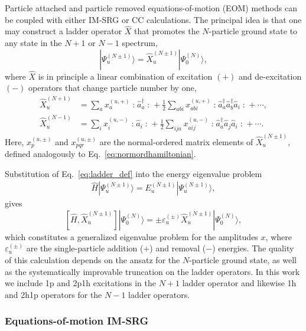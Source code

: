\documentclass[aip, jcp, 12pt]{revtex4-1}
\newcommand{\ket}[1]{| #1 \rangle}
\newcommand{\normord}[1]{\mathopen: #1 \mathclose:}
\begin{document}
Particle attached and particle removed equations-of-motion (EOM) methods can be coupled with either IM-SRG or CC calculations. The principal idea is that one may construct a ladder operator $\hat{X}$ that promotes the $N$-particle ground state to any state in the $N + 1$ or $N - 1$ spectrum,
\begin{equation}\label{eq:ladder_def}
  \ket{\Psi^{(N \pm 1)}_u}  = \hat{X}^{(N \pm 1)}_u \ket{\Psi^{(N)}_0},
\end{equation}
where $\hat{X}$ is in principle a linear combination of excitation $(+)$ and de-excitation $(-)$ operators that change particle number by one,
\begin{align}
  \label{eq:gen_attached}
  \hat{X}^{(N + 1)}_u &= \sum_a x^{(u, +)}_a  \normord{\hat{a}^\dagger_a} + \frac{1}{2} \sum_{a b i} x^{(u, +)}_{a b i} \normord{\hat{a}^\dagger_a \hat{a}^\dagger_b \hat{a}_i^{}} + \cdots,  \\
  \label{eq:gen_removed}
  \hat{X}^{(N - 1)}_u &= \sum_i x_i^{(u, -)} \normord{\hat{a}_i^{}} + \frac{1}{2} \sum_{i j a} x^{(u, -)}_{a i j} \normord{\hat{a}^\dagger_a \hat{a}_j^{} \hat{a}_i^{}}  + \cdots.
\end{align}
Here, $x^{(u, \pm)}_p$ and $x^{(u, \pm)}_{p q r}$ are the normal-ordered matrix elements of $\hat{X}_u^{(N \pm 1)}$, defined analogously to Eq.\ \eqref{eq:normordhamiltonian}.

Substitution of Eq.\ \eqref{eq:ladder_def} into the energy eigenvalue problem
\begin{gather*}
  \hat H \ket{\Psi_u^{(N \pm 1)}} = E^{(N\pm1)}_u \ket{\Psi_u^{(N \pm 1)}},
\end{gather*}
gives
\begin{equation}\label{eq:EOM}
  [\hat{H}, \hat{X}^{(N \pm 1)}_u] \ket{\Psi^{(N)}_0} = \pm \varepsilon^{(\pm)}_u \hat{X}^{(N \pm 1)}_u \ket{\Psi^{(N)}_0},
\end{equation}
which constitutes a generalized eigenvalue problem for the amplitudes $x$, where $\varepsilon^{(\pm)}_u$ are the single-particle addition ($+$) and removal ($-$) energies. The quality of this calculation depends on the ansatz for the $N$-particle ground state, as well as the systematically improvable truncation on the ladder operators. In this work we include 1p and 2p1h excitations in the $N + 1$ ladder operator and likewise 1h and 2h1p operators for the $N - 1$ ladder operators.

\subsubsection*{Equations-of-motion IM-SRG}
\end{document}
